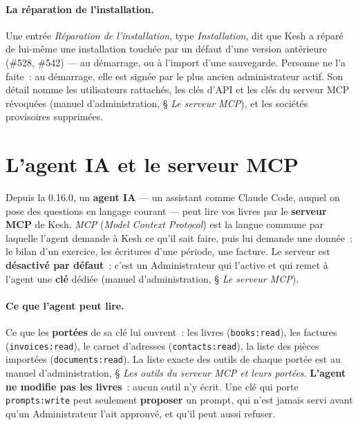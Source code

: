\documentclass[a4paper,11pt,oneside]{article}
\begin{document}
\paragraph{La réparation de l'installation.} Une entrée \emph{Réparation de
l'installation}, type \emph{Installation}, dit que Kesh a réparé de lui-même une
installation touchée par un défaut d'une version antérieure (\#528, \#542) ---
au démarrage, ou à l'import d'une sauvegarde. Personne ne l'a faite~: au
démarrage, elle est signée par le plus ancien administrateur actif. Son détail
nomme les utilisateurs rattachés, les clés d'API et les clés du serveur MCP
révoquées (manuel d'administration, § \emph{Le serveur MCP}), et les sociétés provisoires supprimées.

\section{L'agent IA et le serveur MCP}\label{sec:agent-mcp}

Depuis la 0.16.0, un \textbf{agent IA} --- un assistant comme Claude Code, auquel on pose des
questions en langage courant --- peut lire vos livres par le \textbf{serveur MCP} de Kesh.
\emph{MCP} (\emph{Model Context Protocol}) est la langue commune par laquelle l'agent demande à
Kesh ce qu'il sait faire, puis lui demande une donnée~: le bilan d'un exercice, les écritures
d'une période, une facture. Le serveur est \textbf{désactivé par défaut}~; c'est un
Administrateur qui l'active et qui remet à l'agent une \textbf{clé} dédiée (manuel
d'administration, § \emph{Le serveur MCP}).

\paragraph{Ce que l'agent peut lire.} Ce que les \textbf{portées} de sa clé lui ouvrent~: les
livres (\texttt{books:read}), les factures (\texttt{invoices:read}), le carnet d'adresses
(\texttt{contacts:read}), la liste des pièces importées (\texttt{documents:read}). La liste
exacte des outils de chaque portée est au manuel d'administration, § \emph{Les outils du
serveur MCP et leurs portées}. \textbf{L'agent ne modifie pas les livres}~: aucun outil n'y
écrit. Une clé qui porte \texttt{prompts:write} peut seulement \textbf{proposer} un prompt, qui
n'est jamais servi avant qu'un Administrateur l'ait approuvé, et qu'il peut aussi refuser.
\end{document}
